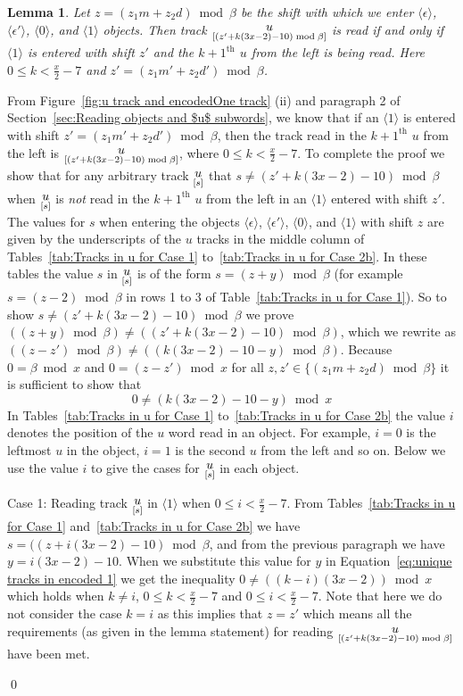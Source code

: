 \documentclass[11pt]{article} \usepackage{amsfonts,amsmath,amssymb,amsthm}
\renewenvironment{proof}{{\bfseries\noindent Proof.}}{\qed\vspace{3.5ex}}
\newtheorem{lemma}{Lemma}
\newcommand{\tne}[1]{\ensuremath{\langle #1\rangle}}
\newcommand{\encodeOne}{\tne{1}}
\newcommand{\encodeZero}{\tne{0}}
\newcommand{\encodeDeletion}{\tne{\epsilon}}
\newcommand{\encodeDeletionPrime}{\tne{\epsilon'}}
\newcommand{\track}[2]{\raisebox{2.5pt}{\ensuremath{\underset{[#1]}#2}}}
\begin{document}
\begin{lemma}\label{lem: ui words with unique shift values}
Let $z=(z_1m+z_2d)\bmod\beta$ be the shift with which we enter $\encodeDeletion$, $\encodeDeletionPrime$, $\encodeZero$, and $\encodeOne$ objects. Then track $\track{(z'+k(3x-2)-10)\bmod\beta}{u}$ is read if and only if $\encodeOne$ is entered with shift $z'$ and the $k+1^{\textrm{th}}$ $u$ from the left is being read. Here $0\leqslant k<\frac{x}{2}-7$ and $z'=(z_1m'+z_2d')\bmod\beta$.
\end{lemma}
\begin{proof}
From Figure~\ref{fig:u track and encodedOne track} (ii) and paragraph 2 of Section~\ref{sec:Reading objects and $u$ subwords}, we know that if an $\encodeOne$ is entered with shift $z'=(z_1m'+z_2d')\bmod\beta$, then the track read in the $k+1^{\textrm{th}}$ $u$ from the left is $\track{(z'+k(3x-2)-10)\bmod\beta}{u}$, where $0\leqslant k<\frac{x}{2}-7$. To complete the proof we show that for any arbitrary track $\track{s}{u}$ that $s\neq (z'+k(3x-2)-10)\bmod\beta$ when $\track{s}{u}$ is \emph{not} read in the $k+1^{\textrm{th}}$ $u$ from the left in an $\encodeOne$ entered with shift $z'$. 
The values for $s$ when entering the objects $\encodeDeletion$, $\encodeDeletionPrime$, $\encodeZero$, and $\encodeOne$ with shift $z$ are given by the underscripts of the $u$ tracks in the middle column of Tables~\ref{tab:Tracks in u for Case 1} to~\ref{tab:Tracks in u for Case 2b}. 
In these tables the value $s$ in $\track{s}{u}$ is of the form $s=(z+y)\bmod\beta$ (for example $s=(z-2)\bmod\beta$ in rows 1 to 3 of Table~\ref{tab:Tracks in u for Case 1}). 
So to show $s\neq (z'+k(3x-2)-10)\bmod\beta$ we prove $((z+y)\bmod\beta) \neq ((z'+k(3x-2)-10)\bmod\beta) $, which we rewrite as $((z-z')\bmod\beta) \neq ((k(3x-2)-10-y)\bmod\beta)$. Because $0=\beta\bmod x$ and $0=(z-z')\bmod x$ for all  $z,z'\in\{(z_1m+z_2d)\bmod\beta\}$ it is sufficient to show that 
\begin{equation}\label{eq:unique tracks in encoded 1}
0\neq(k(3x-2)-10-y)\bmod x 
\end{equation}
In Tables~\ref{tab:Tracks in u for Case 1} to~\ref{tab:Tracks in u for Case 2b} the value $i$ denotes the position of the $u$ word read in an object. For example, $i=0$ is the leftmost $u$ in the object, $i=1$ is the second $u$ from the left and so on. Below we use the value $i$ to give the cases for $\track{s}{u}$ in each object.

Case 1: Reading track $\track{s}{u}$ in $\encodeOne$ when $0\leqslant i<\frac{x}{2}-7$. From Tables~\ref{tab:Tracks in u for Case 1} and~\ref{tab:Tracks in u for Case 2b} we have $s=((z+i(3x-2)-10)\bmod\beta$, and from the previous paragraph we have $y=i(3x-2)-10$. When we substitute this value for $y$ in Equation~\eqref{eq:unique tracks in encoded 1} we get the inequality $0\neq((k-i)(3x-2))\bmod x$ which holds when $k\neq i$, $0\leqslant k<\frac{x}{2}-7$ and $0\leqslant i<\frac{x}{2}-7$. Note that here we do not consider the case $k=i$ as this implies that $z=z'$ which means all the requirements (as given in the lemma statement) for reading $\track{(z'+k(3x-2)-10)\bmod\beta}{u}$ have been met.


\end{proof}
\end{document}
